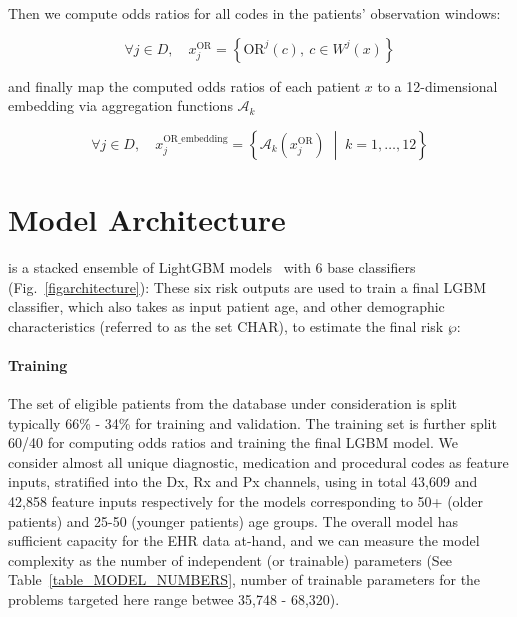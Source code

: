 Then we compute odds ratios for all codes in the patients' observation windows:

\begin{equation}
\forall j \in D, \quad x^{\text{OR}}_j = \left\{ \text{OR}^j(c), \ c \in W^j(x) \right\}
\end{equation}

and finally map the computed odds ratios of each patient $x$ to a 12-dimensional embedding via aggregation functions $\mathcal{A}_k$

\begin{equation}
\forall j \in D, \quad x^{\text{OR\_embedding}}_j = \left\{ \mathcal{A}_k\left(x^{\text{OR}}_j \right) \;\middle|\; k = 1, \ldots, 12 \right\}
\end{equation}

\section*{Model Architecture}
\zcor is a stacked ensemble of LightGBM models~\cite{ke2017lightgbm} with $6$ base classifiers (Fig.~\ref{figarchitecture}):
%
These six risk outputs are used to train a final LGBM classifier, which also takes  as input patient age, and other demographic characteristics (referred to as the set $\text{CHAR}$), to estimate the final \zcor risk $\wp$:
%
\paragraph*{Training} The  set of eligible patients from the database under consideration  is split typically 66\% - 34\% for training and validation. The training set is further split 60/40 for computing odds ratios and training the final LGBM model.
We consider almost all unique  diagnostic, medication and procedural codes as feature inputs, stratified into the Dx, Rx and Px channels, using in total 43,609 and 42,858 feature inputs respectively for the models corresponding to  50+ (older patients)  and 25-50 (younger patients) age groups. The overall \zcor model has sufficient capacity for the EHR data at-hand, and we can measure the model  complexity as the number of independent (or trainable) parameters (See Table~\ref{table_MODEL_NUMBERS}, number of trainable parameters for the problems targeted here range betwee 35,748 - 68,320). 

